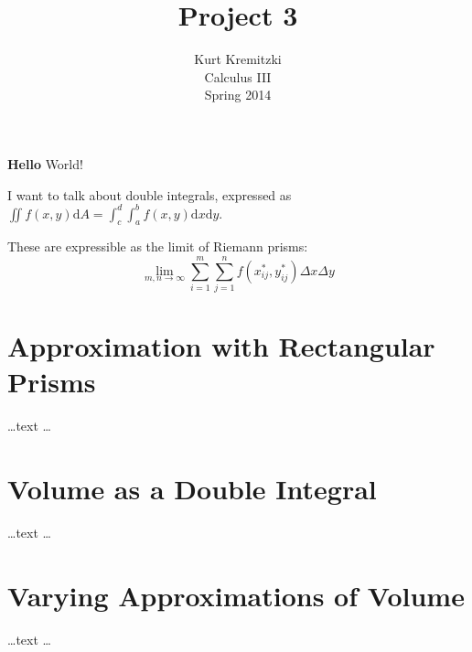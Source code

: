 \documentclass{article}
\begin{document}
\title{Project 3}
\author{Kurt Kremitzki\\
        Calculus III\\
        Spring 2014}
\maketitle

{\bf Hello} World!

I want to talk about double integrals, expressed as $\iint f(x,y)\mathrm{d}A= \int_c^d\int_a^b f(x,y) \mathrm{d}x \mathrm{d}y$.

These are expressible as the limit of Riemann prisms:
\begin{equation}
    \lim_{m,n \to \infty} \sum_{i=1}^{m} \sum_{j=1}^{n} f(x_{ij}^{ *}, y_{ij}^{ *}) \Delta x \Delta y
\end{equation}

\section{Approximation with Rectangular Prisms}
    \ldots text \ldots

\section{Volume as a Double Integral}
    \ldots text \ldots

\section{Varying Approximations of Volume}
    \ldots text \ldots
\end{document}
